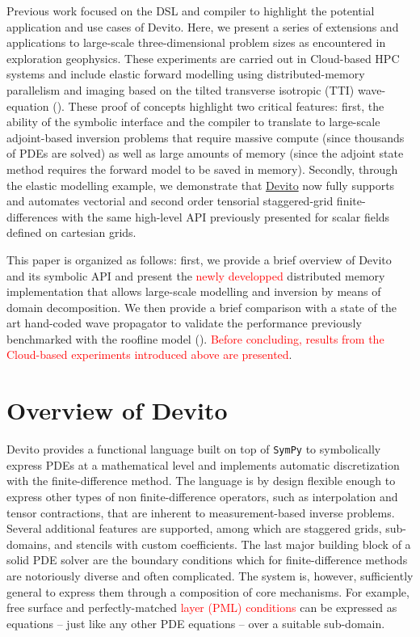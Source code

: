 \documentclass[10pt, conference]{IEEEtran}
\newcommand{\devito}{\href{https://github.com/devitocodes/devito}{Devito} }
\begin{document}
Previous work focused on the DSL and compiler to highlight the potential
application and use cases of Devito. Here, we present a series of
extensions and applications to large-scale three-dimensional problem sizes
as encountered in exploration geophysics. These experiments are carried
out in Cloud-based HPC systems and include elastic forward modelling using
distributed-memory parallelism and imaging based on the tilted transverse
isotropic (TTI) wave-equation (\cite{virieux, thomsen1986, zhang-tti,
duveneck, louboutin2018segeow}). These proof of concepts highlight two
critical features: first, the ability of the symbolic interface and the
compiler to translate to large-scale adjoint-based inversion problems that
require massive compute (since thousands of PDEs are solved) as well as
large amounts of memory (since the adjoint state method requires the
forward model to be saved in memory). Secondly, through the elastic
modelling example, we demonstrate that \devito now fully supports and
automates vectorial and second order tensorial staggered-grid
finite-differences with the same high-level API previously presented for
scalar fields defined on cartesian grids.

This paper is organized as follows: first, we provide a brief overview of
Devito and its symbolic API and present the \textcolor{red}{newly developped} distributed memory
implementation that allows large-scale modelling and inversion by means of
domain decomposition. We then provide a brief comparison with a state of
the art hand-coded wave propagator to validate the performance previously
benchmarked with the roofline model (\cite{patterson, devito-compiler,
devito-api, louboutin2016ppf}). \textcolor{red}{Before concluding, results from the
Cloud-based experiments introduced above are presented}.

\section{Overview of Devito}\label{overview-of-devito}

Devito \cite{devito-api} provides a functional language built on top of
\texttt{SymPy} \cite{sympy} to symbolically express PDEs at a
mathematical level and implements automatic discretization with the
finite-difference method. The language is by design flexible enough to
express other types of non finite-difference operators, such as
interpolation and tensor contractions, that are inherent to
measurement-based inverse problems. Several additional features are
supported, among which are staggered grids, sub-domains, and stencils with
custom coefficients. The last major building block of a solid PDE solver
are the boundary conditions which for finite-difference methods are
notoriously diverse and often complicated. The system is, however,
sufficiently general to express them through a composition of core
mechanisms. For example, free surface and perfectly-matched \textcolor{red}{layer
(PML) conditions} can be expressed as equations -- just like
any other PDE equations -- over a suitable sub-domain.
\end{document}

